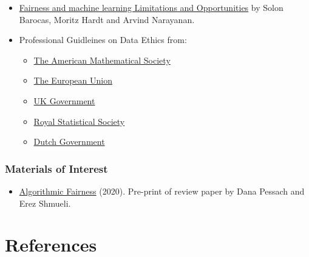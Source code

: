 \documentclass[
  letterpaper,
  DIV=11,
  numbers=noendperiod]{scrreprt}
\providecommand{\tightlist}{%
  \setlength{\itemsep}{0pt}\setlength{\parskip}{0pt}}\usepackage{longtable,booktabs,array}
\newlength{\cslhangindent}
\newenvironment{CSLReferences}[2] %
 {\begin{list}{}{%
  \setlength{\itemindent}{0pt}
  \setlength{\leftmargin}{0pt}
  \setlength{\parsep}{0pt}
  \ifodd #1
   \setlength{\leftmargin}{\cslhangindent}
   \setlength{\itemindent}{-1\cslhangindent}
  \fi
  \setlength{\itemsep}{#2\baselineskip}}}
 {\end{list}}
\begin{document}
\begin{itemize}
\item
  \href{https://fairmlbook.org/}{Fairness and machine learning
  Limitations and Opportunities} by Solon Barocas, Moritz Hardt and
  Arvind Narayanan.
\item
  Professional Guidleines on Data Ethics from:

  \begin{itemize}
  \tightlist
  \item
    \href{http://www.ams.org/about-us/governance/policy-statements/sec-ethics}{The
    American Mathematical Society}
  \item
    \href{https://op.europa.eu/s/sUPP}{The European Union}
  \item
    \href{https://www.gov.uk/guidance/understanding-artificial-intelligence-ethics-and-safety}{UK
    Government}
  \item
    \href{https://rss.org.uk/RSS/media/News-and-publications/Publications/Reports\%20and\%20guides/A-Guide-for-Ethical-Data-Science-Final-Oct-2019.pdf}{Royal
    Statistical Society}
  \item
    \href{https://www.government.nl/documents/reports/2021/07/31/impact-assessment-fundamental-rights-and-algorithms}{Dutch
    Government}
  \end{itemize}
\end{itemize}

\subsection*{Materials of Interest}\label{materials-of-interest-4}

\begin{itemize}
\tightlist
\item
  \href{https://arxiv.org/abs/2001.09784}{Algorithmic Fairness} (2020).
  Pre-print of review paper by Dana Pessach and Erez Shmueli.
\end{itemize}

\chapter*{References}\label{references}


\label{refs}
\begin{CSLReferences}{0}{1}
\end{CSLReferences}
\end{document}
